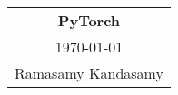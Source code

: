 



\raggedright
\footnotesize
\begin{multicols*}{3}
\setlength{\premulticols}{1pt}
\setlength{\postmulticols}{1pt}
\setlength{\multicolsep}{1pt}
\setlength{\columnsep}{2pt}

\begin{center}
\begin{tabular}{c}
\LARGE{\textbf{PyTorch}}\\
\today\\
Ramasamy Kandasamy\\
\end{tabular}
\end{center}





\end{multicols*}
